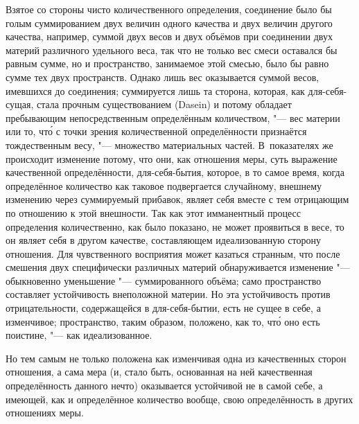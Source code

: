 Взятое со стороны чисто количественного определения, соединение было бы голым
суммированием двух величин одного качества и двух величин другого качества,
например, суммой двух весов и двух объёмов при соединении двух материй
различного удельного веса, так что не только вес смеси оставался бы равным
сумме, но и пространство, занимаемое этой смесью, было бы равно сумме тех двух
пространств. Однако лишь вес оказывается суммой весов, имевшихся до соединения;
суммируется лишь та сторона, которая, как для-себя-сущая, стала прочным
существованием (Dasein) и потому обладает пребывающим непосредственным
определённым количеством, "--- вес материи или то, чт\'{о} с точки зрения
количественной определённости признаётся тождественным весу, "--- множество
материальных частей. В~показателях же происходит изменение потому, что они, как
отношения меры, суть выражение качественной определённости, для-себя-бытия,
которое, в то самое время, когда определённое количество как таковое
подвергается случайному, внешнему изменению через суммируемый прибавок, являет
себя вместе с тем отрицающим по отношению к этой внешности. Так как этот
имманентный процесс определения количественно, как было показано, не может
проявиться в весе, то он являет себя в другом качестве, составляющем
идеализованную сторону отношения. Для чувственного восприятия может казаться
странным, что после смешения двух специфически различных материй обнаруживается
изменение "--- обыкновенно уменьшение "--- суммированного объёма; само
пространство составляет устойчивость внеположной материи. Но эта устойчивость
против отрицательности, содержащейся в для-себя-бытии, есть не сущее в себе, а
изменчивое; пространство, таким образом, положено, как то, чт\'{о} оно есть
поистине, "--- как идеализованное.

Но тем самым не только положена как изменчивая одна из качественных сторон
отношения, а сама мера (и, стало быть, основанная на ней качественная
определённость данного нечто) оказывается устойчивой не в самой себе, а
имеющей, как и определённое количество вообще, свою определённость в других
отношениях меры.


